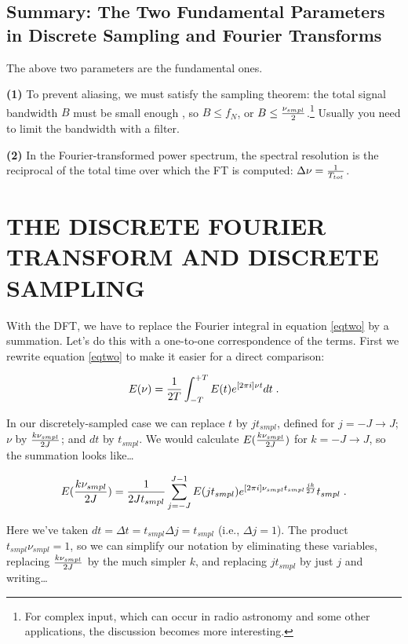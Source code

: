 \documentclass[preprint]{aastex}
\begin{document}
\subsection {Summary: The Two Fundamental Parameters in Discrete
Sampling and Fourier Transforms}

	The above two parameters are the fundamental ones.  

	{\bf (1)} To prevent aliasing, we must satisfy the sampling
theorem: the total signal bandwidth $B$ must be small enough , so $B
\leq f_N$, or $B \leq {\nu_{smpl} \over 2}$.\footnote{For complex input,
which can occur in radio astronomy and some other applications, the
discussion becomes more interesting.} Usually you need to limit the
bandwidth with a filter.

	{\bf (2)} In the Fourier-transformed power spectrum, the spectral
resolution is the reciprocal of the total time over which the FT is
computed: $\Delta \nu ={1 \over T_{tot}}$. 

\section{THE DISCRETE FOURIER TRANSFORM AND DISCRETE SAMPLING}

\label{four}

	With the DFT, we have to replace the Fourier integral in
equation \ref{eqtwo} by a summation.  Let's do this with a one-to-one
correspondence of the terms. First we rewrite equation \ref{eqtwo} to
make it easier for a direct comparison:

\begin{equation} \label{eqtwoa}
E(\nu) = {1 \over 2T}
\int_{-T}^{+T} E(t) e^{[2 \pi i]\nu t}  dt \; .
\end{equation}

	In our discretely-sampled case we can replace $t$ by $j
t_{smpl}$, defined for $j = -J \rightarrow J$; $\nu$ by ${k\nu_{smpl}
\over 2J}$; and $dt$ by $t_{smpl}$.  We would calculate
$E({k\nu_{smpl}\over 2J})$ for $k = -J \rightarrow J$, so the summation
looks like\dots

\begin{equation} \label{eqfivea}
E({k\nu_{smpl} \over 2J}) = {1 \over 2Jt_{smpl}} \sum_{j=-J}^{J-1}  E(j
t_{smpl}) e^{[2 \pi i] \nu_{smpl}t_{smpl} {jk \over 2J}} t_{smpl} \; .
\end{equation}

\noindent Here we've taken $dt = \Delta t = t_{smpl} \Delta j =
t_{smpl}$ (i.e., $\Delta j=1$).  The product $t_{smpl}\nu_{smpl} = 1$,
so we can simplify our notation by eliminating these variables,
replacing ${k\nu_{smpl} \over 2J}$ by the much simpler $k$, and
replacing $j t_{smpl}$ by just $j$ and writing\dots
\end{document}
